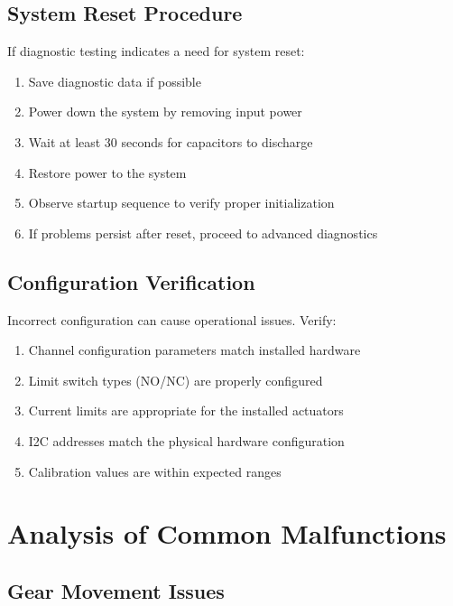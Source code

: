 \documentclass[12pt,a4paper,twoside,openright]{book}
\begin{document}
\subsection{System Reset Procedure}

If diagnostic testing indicates a need for system reset:

\begin{enumerate}
    \item Save diagnostic data if possible
    \item Power down the system by removing input power
    \item Wait at least 30 seconds for capacitors to discharge
    \item Restore power to the system
    \item Observe startup sequence to verify proper initialization
    \item If problems persist after reset, proceed to advanced diagnostics
\end{enumerate}

\subsection{Configuration Verification}

Incorrect configuration can cause operational issues. Verify:

\begin{enumerate}
    \item Channel configuration parameters match installed hardware
    \item Limit switch types (NO/NC) are properly configured
    \item Current limits are appropriate for the installed actuators
    \item I2C addresses match the physical hardware configuration
    \item Calibration values are within expected ranges
\end{enumerate}

\section{Analysis of Common Malfunctions}

\subsection{Gear Movement Issues}
\end{document}
